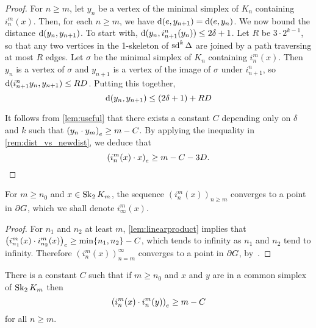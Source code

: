 \documentclass[a4paper]{article}
\begin{document}
\begin{proof}
  For $n \geq m$, let $y_n$ be a vertex of the minimal simplex of $K_n$
  containing $i^m_n(x)$. Then, for each $n \geq m$, we have $\dist(e, y_{n+1})
  = \dist(e, y_n)$.  We now bound the distance $\dist(y_n, y_{n+1})$. To start
  with, $\dist(y_n, i^n_{n+1} (y_n)) \leq 2\delta+1$. Let $R$ be $3\cdot
  2^{k-1}$, so that any two vertices in the 1-skeleton of $\sd^k \Delta$ are
  joined by a path traversing at most $R$ edges. Let $\sigma$ be the minimal
  simplex of $K_n$ containing $i^m_n(x)$. Then $y_n$ is a vertex of $\sigma$
  and $y_{n+1}$ is a vertex of the image of $\sigma$ under $i^n_{n+1}$, so
  $\dist(i^n_{n+1} y_n, y_{n+1}) \leq RD$.  Putting this together,
  \begin{equation*}
    \dist(y_n, y_{n+1}) \leq (2\delta + 1) + RD
  \end{equation*}

  It follows from \cref{lem:useful} that there exists a constant $C$ depending
  only on $\delta$ and $k$ such that $\gromov{e}{y_n}{y_m} \geq m -
  C$.  By applying the inequality in \cref{rem:dist_vs_newdist}, we deduce that
  \begin{equation*}
      \gromov{e}{i^m_n(x)}{x} \geq m - C - 3D.\qedhere
  \end{equation*}
\end{proof}

\begin{corollary}
  For $m \geq n_0$ and $x \in \Skel_2 K_m$, the sequence
  $(i^m_n(x))_{n\geq m}$ converges to a point in $\boundary G$, which we shall
  denote $i^m_\infty(x)$.
\end{corollary}

\begin{proof}
  For $n_1$ and $n_2$ at least $m$, \cref{lem:linearproduct} implies that
  $\gromov{e}{i^m_{n_1}(x)}{i^m_{n_2}(x)} \geq \min\{n_1,n_2\} - C$, which
  tends to infinity as $n_1$ and $n_2$ tend to infinity. Therefore
  $(i^m_n(x))_{n=m}^\infty$ converges to a point in $\boundary G$,
  by~\cite[Lemma III.H.3.13]{bridsonhaefliger99}.
\end{proof}

\begin{lemma}\label{lem:simplexproduct}
  There is a constant $C$ such that if $m \geq n_0$ and $x$ and $y$ are in a
  common simplex of $\Skel_2 K_m$ then
  \begin{equation*}
    \gromov{e}{i^m_n(x)}{i^m_n(y)} \geq m - C
  \end{equation*}
  for all $n\geq m$.
\end{lemma}
\end{document}
